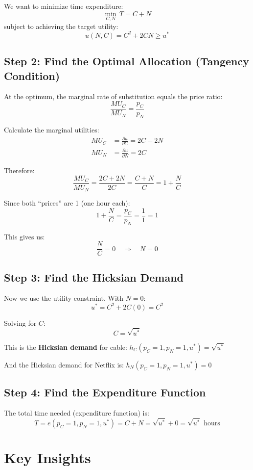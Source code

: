 \documentclass[11pt]{article}
\begin{document}
We want to minimize time expenditure:
\[
\min_{C, N} \, T = C + N
\]
subject to achieving the target utility:
\[
u(N, C) = C^2 + 2CN \geq u^*
\]

\subsection{Step 2: Find the Optimal Allocation (Tangency Condition)}

At the optimum, the marginal rate of substitution equals the price ratio:
\[
\frac{MU_C}{MU_N} = \frac{p_C}{p_N}
\]

Calculate the marginal utilities:
\begin{align*}
MU_C &= \frac{\partial u}{\partial C} = 2C + 2N \\
MU_N &= \frac{\partial u}{\partial N} = 2C
\end{align*}

Therefore:
\[
\frac{MU_C}{MU_N} = \frac{2C + 2N}{2C} = \frac{C + N}{C} = 1 + \frac{N}{C}
\]

Since both ``prices'' are 1 (one hour each):
\[
1 + \frac{N}{C} = \frac{p_C}{p_N} = \frac{1}{1} = 1
\]

This gives us:
\[
\frac{N}{C} = 0 \quad \Rightarrow \quad \boxed{N = 0}
\]

\subsection{Step 3: Find the Hicksian Demand}

Now we use the utility constraint. With $N = 0$:
\[
u^* = C^2 + 2C(0) = C^2
\]

Solving for $C$:
\[
\boxed{C = \sqrt{u^*}}
\]

This is the \textbf{Hicksian demand} for cable: $h_C(p_C=1, p_N=1, u^*) = \sqrt{u^*}$

And the Hicksian demand for Netflix is: $h_N(p_C=1, p_N=1, u^*) = 0$

\subsection{Step 4: Find the Expenditure Function}

The total time needed (expenditure function) is:
\[
\boxed{T = e(p_C=1, p_N=1, u^*) = C + N = \sqrt{u^*} + 0 = \sqrt{u^*} \text{ hours}}
\]

\section{Key Insights}
\end{document}
